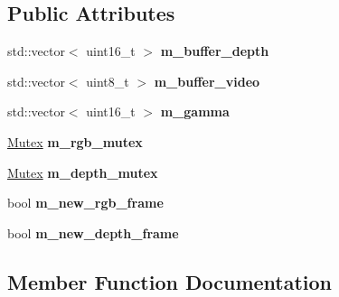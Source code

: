 \subsection*{Public Attributes}
\begin{DoxyCompactItemize}
\item 
\hypertarget{class_my_freenect_device_af3fdd25c87de58b30f6cf2ba7f062d6e}{}\label{class_my_freenect_device_af3fdd25c87de58b30f6cf2ba7f062d6e} 
std\+::vector$<$ uint16\+\_\+t $>$ {\bfseries m\+\_\+buffer\+\_\+depth}
\item 
\hypertarget{class_my_freenect_device_ae9ddeeeac266f391e522d67659abc598}{}\label{class_my_freenect_device_ae9ddeeeac266f391e522d67659abc598} 
std\+::vector$<$ uint8\+\_\+t $>$ {\bfseries m\+\_\+buffer\+\_\+video}
\item 
\hypertarget{class_my_freenect_device_a5be6da41779149d936cb2d64f9906439}{}\label{class_my_freenect_device_a5be6da41779149d936cb2d64f9906439} 
std\+::vector$<$ uint16\+\_\+t $>$ {\bfseries m\+\_\+gamma}
\item 
\hypertarget{class_my_freenect_device_a71e349e165b5e2df1690ab3383822ec2}{}\label{class_my_freenect_device_a71e349e165b5e2df1690ab3383822ec2} 
\hyperlink{class_mutex}{Mutex} {\bfseries m\+\_\+rgb\+\_\+mutex}
\item 
\hypertarget{class_my_freenect_device_a032d4f875dcfb8732edfbbc8755c5559}{}\label{class_my_freenect_device_a032d4f875dcfb8732edfbbc8755c5559} 
\hyperlink{class_mutex}{Mutex} {\bfseries m\+\_\+depth\+\_\+mutex}
\item 
\hypertarget{class_my_freenect_device_ad2901a2b40db6db0570a0b74e52f668a}{}\label{class_my_freenect_device_ad2901a2b40db6db0570a0b74e52f668a} 
bool {\bfseries m\+\_\+new\+\_\+rgb\+\_\+frame}
\item 
\hypertarget{class_my_freenect_device_adfd5f122a98faec3a04b6832bb2e5df9}{}\label{class_my_freenect_device_adfd5f122a98faec3a04b6832bb2e5df9} 
bool {\bfseries m\+\_\+new\+\_\+depth\+\_\+frame}
\end{DoxyCompactItemize}


\subsection{Member Function Documentation}
\hypertarget{class_my_freenect_device_a8f2e6948134273dcc72d38d24acd05e3}{}\label{class_my_freenect_device_a8f2e6948134273dcc72d38d24acd05e3} 
